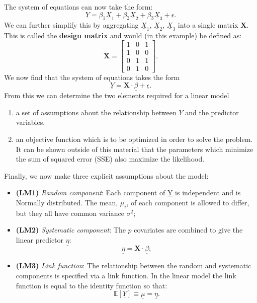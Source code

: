 \documentclass{article}
\begin{document}
The system of equations can now take the form:
\begin{equation}
    \underline{Y} = \beta_1\underline{X}_1 + \beta_2\underline{X}_2 + \beta_3\underline{X}_3 + \underline{\epsilon}.
\end{equation}
We can further simplify this by aggregating $\underline{X}_1$, $\underline{X}_2$, $\underline{X}_3$ into a single matrix $\mathbf{X}$. This is called the \textbf{design matrix} and would (in this example) be defined as:
\begin{equation}
    \mathbf{X} = \begin{bmatrix} 1 & 0 & 1 \\ 1 & 0 & 0 \\ 0 & 1 & 1 \\ 0 & 1 & 0 \end{bmatrix}.
\end{equation}
We now find that the system of equations takes the form
\begin{equation}
    \underline{Y} = \mathbf{X}\cdot\underline{\beta} + \underline{\epsilon}.
\end{equation}
From this we can determine the two elements required for a linear model
\begin{enumerate}
    \item a set of assumptions about the relationship between $\underline{Y}$ and the predictor variables,
    \item an objective function which is to be optimized in order to solve the problem. It can be shown outside of this material that the parameters which minimize the sum of squared error (SSE) also maximize the likelihood.
\end{enumerate}
Finally, we now make three explicit assumptions about the model:
\begin{itemize}
    \item \textbf{(LM1)} \textit{Random component}: Each component of \underline{Y} is independent and is Normally distributed. The mean, $\mu_i$, of each component is allowed to differ, but they all have common variance $\sigma^2$; 
    \item \textbf{(LM2)} \textit{Systematic component}: The $p$ covariates are combined to give the linear predictor $\underline{\eta}$:
\begin{equation}
    \underline{\eta} = \mathbf{X}\cdot\underline{\beta};
\end{equation}
\item \textbf{(LM3)} \textit{Link function}: The relationship between the random and systematic components is specified via a link function. In the linear model the link function is equal to the identity function so that:
\begin{equation}
    \mathbb{E}[\underline{Y}] \equiv \underline{\mu} = \underline{\eta}.
\end{equation}
\end{itemize}
\end{document}
